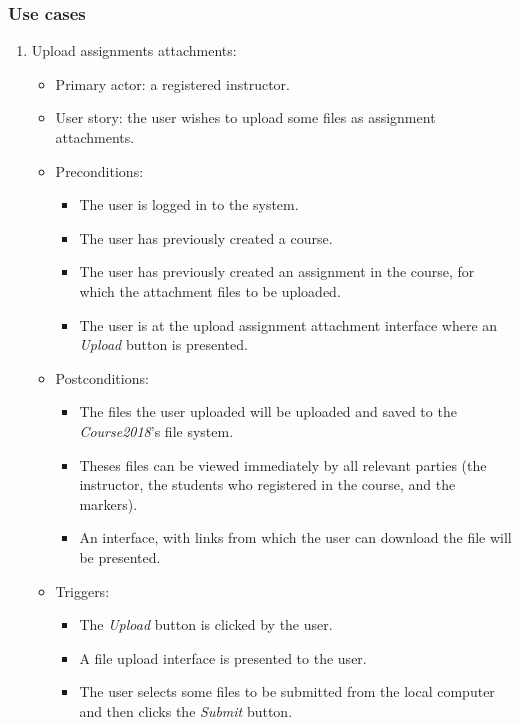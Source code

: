 \subsubsection{Use cases}
\begin{enumerate}

\item Upload assignments attachments:
\begin{itemize}
    \item Primary actor: a registered instructor.
    \item User story: the user wishes to upload some files as assignment
        attachments.
    \item Preconditions:
        \begin{itemize}
            \item The user is logged in to the system.
            \item The user has previously created a course.
            \item The user has previously created an assignment in the course,
                for which the attachment files to be uploaded.
            \item The user is at the upload assignment attachment interface
                where an \emph{Upload} button is presented.
        \end{itemize}
    \item Postconditions:
        \begin{itemize}
            \item The files the user uploaded will be uploaded and saved to the
                \emph{Course2018}'s file system.
            \item Theses files can be viewed immediately by all relevant parties
                (the instructor, the students who registered in the course,
                and the markers).
            \item An interface, with links from which the user can
                download the file will be presented.
        \end{itemize}
    \item Triggers:
        \begin{itemize}
            \item The \emph{Upload} button is clicked by the user.
            \item A file upload interface is presented to the user.
            \item The user selects some files to be submitted from the
                local computer and then clicks the \emph{Submit} button.

\end{itemize}
\end{itemize}
\end{enumerate}
